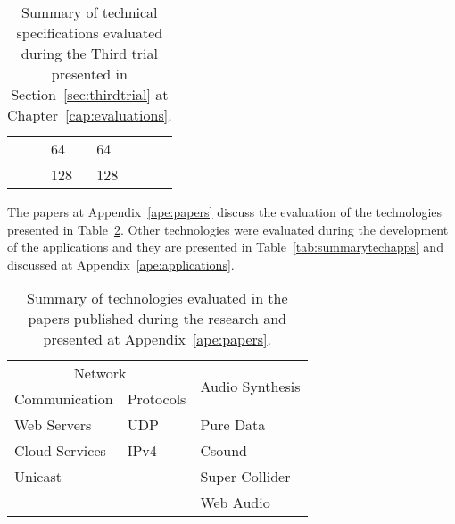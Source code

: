 \begin{table}[]
\begin{tabular}{l|l|l|l|l|l}
		&                        & 64                                                                               & 64                                                                                   &                                                                          &                 \\ \cline{3-4}
		&                        & 128                                                                              & 128                                                                                  &                                                                          &                 \\ \hline
	\end{tabular}
	\caption{Summary of technical specifications evaluated during the Third trial presented in Section~\ref{sec:thirdtrial} at Chapter~\ref{cap:evaluations}.}
	\label{tab:summaryspeceval3}
\end{table}


The papers at Appendix~\ref{ape:papers} discuss the evaluation of the technologies presented in Table~\ref{tab:summarytechpapers}.
Other technologies were evaluated during the development of the applications and they are presented in Table~\ref{tab:summarytechapps} and discussed at Appendix~\ref{ape:applications}.


\begin{table}[!ht]
	\centering
	\begin{tabular}{l|l|l}
		\multicolumn{2}{c|}{Network} & \multirow{2}{*}{Audio Synthesis} \\
		Communication   & Protocols  &                                  \\ \hline
		Web Servers     & UDP        & Pure Data                        \\ \hline
		Cloud Services  & IPv4       & Csound                           \\ \cline{1-1} \cline{3-3} 
		Unicast         &            & Super Collider                   \\ \cline{1-1} \cline{3-3} 
		&            & Web Audio                        \\ \hline
	\end{tabular}
	\caption{Summary of technologies evaluated in the papers published during the research and presented at Appendix~\ref{ape:papers}.}
	\label{tab:summarytechpapers}
\end{table}



